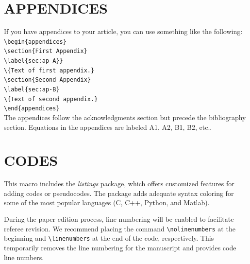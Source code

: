\documentclass[9pt,article,twoside]{fapet-rho-class/fapet-rho}
\newcommand{\CS}[1]{\texttt{\textbackslash #1}}
\begin{document}
\section{APPENDICES}

If you have appendices to your article, you can use something like the following:\\
    
    \noindent\CS{begin}\verb|{appendices}|\\
    \CS{section}\verb|{First Appendix}|\\
    \CS{label}\verb|{sec:ap-A}}|\\
    \CS{}\verb|{Text of first appendix.}|\\
    \CS{section}\verb|{Second Appendix}|\\
    \CS{label}\verb|{sec:ap-B}|\\
    \CS{}\verb|{Text of second appendix.}|\\
    \CS{end}\verb|{appendices}|\\

The appendices follow the acknowledgments section but precede the bibliography section. Equations in the appendices are labeled A1, A2, B1, B2, etc..

\section{CODES}

    This macro includes the \textit{listings} package, which offers customized features for adding codes or pseudocodes. The package adds adequate syntax coloring for some of the most popular languages (C, C++, Python, 
    and Matlab).

    \nolinenumbers
    
    \linenumbers

\vspace{2cm}

    \nolinenumbers
    
    \linenumbers



    \nolinenumbers
    
    \linenumbers

    During the paper edition process, line numbering will be enabled to facilitate referee revision. We recommend placing the command \verb|\nolinenumbers| at the beginning and \verb|\linenumbers| at the end of the code, respectively. This temporarily removes the line numbering for the manuscript and provides code line numbers.
\end{document}
